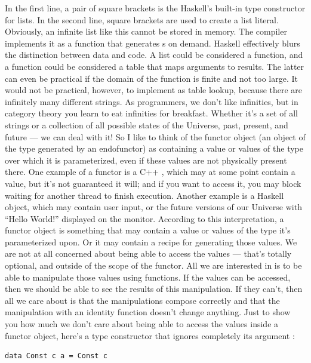 In the first line, a pair of square brackets is the Haskell's built-in
type constructor for lists. In the second line, square brackets are used
to create a list literal. Obviously, an infinite list like this cannot
be stored in memory. The compiler implements it as a function that
generates s on demand. Haskell effectively blurs the
distinction between data and code. A list could be considered a
function, and a function could be considered a table that maps arguments
to results. The latter can even be practical if the domain of the
function is finite and not too large. It would not be practical,
however, to implement  as table lookup, because there are
infinitely many different strings. As programmers, we don't like
infinities, but in category theory you learn to eat infinities for
breakfast. Whether it's a set of all strings or a collection of all
possible states of the Universe, past, present, and future --- we can
deal with it! So I like to think of the functor object (an object of the
type generated by an endofunctor) as containing a value or values of the
type over which it is parameterized, even if these values are not
physically present there. One example of a functor is a C++
, which may at some point contain a value, but it's
not guaranteed it will; and if you want to access it, you may block
waiting for another thread to finish execution. Another example is a
Haskell  object, which may contain user input, or the future
versions of our Universe with ``Hello World!'' displayed on the monitor.
According to this interpretation, a functor object is something that may
contain a value or values of the type it's parameterized upon. Or it may
contain a recipe for generating those values. We are not at all
concerned about being able to access the values --- that's totally
optional, and outside of the scope of the functor. All we are interested
in is to be able to manipulate those values using functions. If the
values can be accessed, then we should be able to see the results of
this manipulation. If they can't, then all we care about is that the
manipulations compose correctly and that the manipulation with an
identity function doesn't change anything. Just to show you how much we
don't care about being able to access the values inside a functor
object, here's a type constructor that ignores completely its argument
:

\begin{verbatim}
data Const c a = Const c
\end{verbatim}

